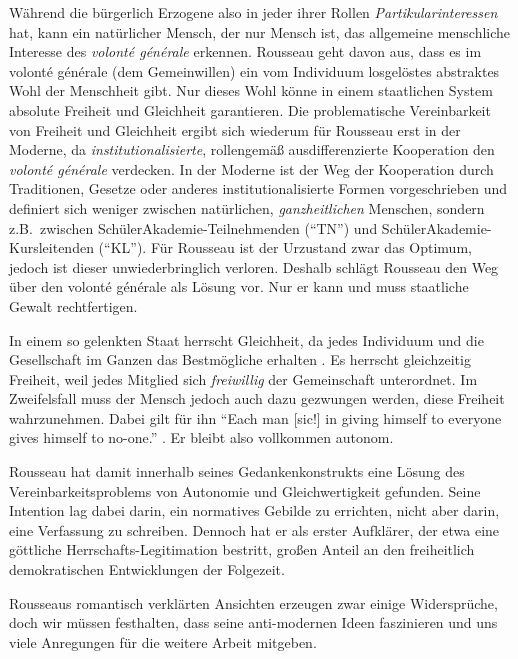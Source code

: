 Während die bürgerlich Erzogene also in jeder ihrer Rollen \emph{Partikularinteressen} hat, kann ein natürlicher Mensch, der nur Mensch ist, das allgemeine menschliche Interesse des \emph{volonté générale} erkennen.
Rousseau geht davon aus, dass es im volonté générale (dem Gemeinwillen) ein vom Individuum losgelöstes abstraktes Wohl der Menschheit gibt.
Nur dieses Wohl könne in einem staatlichen System absolute Freiheit und Gleichheit garantieren.
Die problematische Vereinbarkeit von Freiheit und Gleichheit ergibt sich wiederum für Rousseau erst in der Moderne, da \emph{institutionalisierte}, rollengemäß ausdifferenzierte Kooperation den \emph{volonté générale} verdecken.
In der Moderne ist der Weg der Kooperation durch Traditionen, Gesetze oder anderes institutionalisierte Formen vorgeschrieben und definiert sich weniger zwischen natürlichen, \emph{ganzheitlichen} Menschen, sondern z.B.\ zwischen SchülerAkademie-Teilnehmenden (``TN'') und SchülerAkademie-Kursleitenden (``KL'').
Für Rousseau ist der Urzustand zwar das Optimum, jedoch ist dieser unwiederbringlich verloren.
Deshalb schlägt Rousseau den Weg über den volonté générale als Lösung vor.
Nur er kann und muss staatliche Gewalt rechtfertigen.

In einem so gelenkten Staat herrscht Gleichheit, da jedes Individuum und die Gesellschaft im Ganzen das Bestmögliche erhalten \parencite[7]{Rousseau-1762-b}.
Es herrscht gleichzeitig Freiheit, weil jedes Mitglied sich \emph{freiwillig} der Gemeinschaft unterordnet.
Im Zweifelsfall muss der Mensch jedoch auch dazu gezwungen werden, diese Freiheit wahrzunehmen.
Dabei gilt für ihn ``Each man [sic!] in giving himself to everyone gives himself to no-one.'' \parencite[7]{Rousseau-1762-b}.
Er bleibt also vollkommen autonom.

Rousseau hat damit innerhalb seines Gedankenkonstrukts eine Lösung des Vereinbarkeitsproblems von Autonomie und Gleichwertigkeit gefunden.
Seine Intention lag dabei darin, ein normatives Gebilde zu errichten, nicht aber darin, eine Verfassung zu schreiben.
Dennoch hat er als erster Aufklärer, der etwa eine göttliche Herrschafts-Legitimation bestritt, großen Anteil an den freiheitlich demokratischen Entwicklungen der Folgezeit.

Rousseaus romantisch verklärten Ansichten erzeugen zwar einige Widersprüche, doch wir müssen festhalten, dass seine anti-modernen Ideen faszinieren und uns viele Anregungen für die weitere Arbeit mitgeben.
